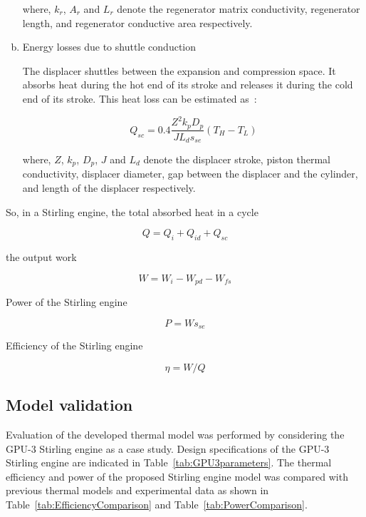 \documentclass[preprint,5p, twocolumn]{elsarticle}
\begin{document}
\begin{enumerate}[a.]
where, $k_r$, $A_r$ and $L_r$ denote the regenerator matrix conductivity, regenerator length, and regenerator conductive area respectively.

\item Energy losses due to shuttle conduction

The displacer shuttles between the expansion and compression space. It absorbs heat during the hot end of its stroke and releases it during the cold end of its stroke. This heat loss can be estimated as~\cite{Timoumi2008}:

\begin{equation}
	Q_{sc} = 0.4\frac{Z^2k_pD_p}{JL_ds_{se}}(T_{H} - T_{L})
\end{equation}

where, $Z$, $k_p$, $D_p$, $J$ and $L_d$ denote the displacer stroke, piston thermal conductivity, displacer diameter, gap between the displacer and the cylinder, and length of the displacer respectively.

\end{enumerate}

So, in a Stirling engine, the total absorbed heat in a cycle

\begin{equation}
	Q = Q_i + Q_{id} + Q_{sc}
\end{equation}

the output work

\begin{equation}
	W = W_i - W_{pd} - W_{fs}
\end{equation}

Power of the Stirling engine

\begin{equation}
	P = Ws_{se}
	\label{Eq:P}
\end{equation}

Efficiency of the Stirling engine

\begin{equation}
	\eta = W/Q
	\label{Eq:eta}
\end{equation}


\subsection{Model validation}

Evaluation of the developed thermal model was performed by considering the GPU-3 Stirling engine as a case study. Design specifications of the GPU-3 Stirling engine are indicated in Table~\ref{tab:GPU3parameters}. The thermal efficiency and power of the proposed Stirling engine model was compared with previous thermal models and experimental data as shown in Table~\ref{tab:EfficiencyComparison} and Table~\ref{tab:PowerComparison}.
\end{document}
